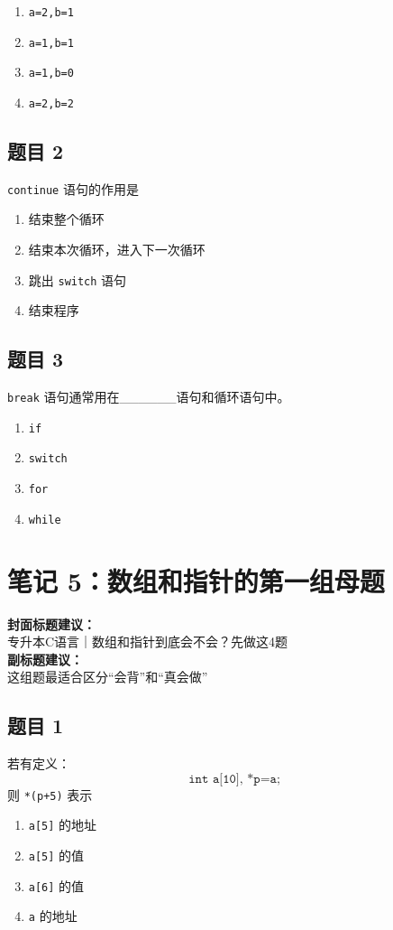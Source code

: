 \documentclass[12pt,a4paper]{ctexart}
\begin{document}
\begin{enumerate}[label=\Alph*.]
    \item \texttt{a=2,b=1}
    \item \texttt{a=1,b=1}
    \item \texttt{a=1,b=0}
    \item \texttt{a=2,b=2}
\end{enumerate}

\subsection*{题目 2}
\texttt{continue} 语句的作用是
\begin{enumerate}[label=\Alph*.]
    \item 结束整个循环
    \item 结束本次循环，进入下一次循环
    \item 跳出 \texttt{switch} 语句
    \item 结束程序
\end{enumerate}

\subsection*{题目 3}
\texttt{break} 语句通常用在\_\_\_\_\_\_语句和循环语句中。
\begin{enumerate}[label=\Alph*.]
    \item \texttt{if}
    \item \texttt{switch}
    \item \texttt{for}
    \item \texttt{while}
\end{enumerate}

\newpage

\section{笔记 5：数组和指针的第一组母题}
\begin{coverbox}
\textbf{封面标题建议：}\\
专升本C语言｜数组和指针到底会不会？先做这4题\\
\textbf{副标题建议：}\\
这组题最适合区分“会背”和“真会做”
\end{coverbox}

\subsection*{题目 1}
若有定义：
\[
\texttt{int a[10], *p=a;}
\]
则 \texttt{*(p+5)} 表示
\begin{enumerate}[label=\Alph*.]
    \item \texttt{a[5]} 的地址
    \item \texttt{a[5]} 的值
    \item \texttt{a[6]} 的值
    \item \texttt{a} 的地址
\end{enumerate}
\end{document}

